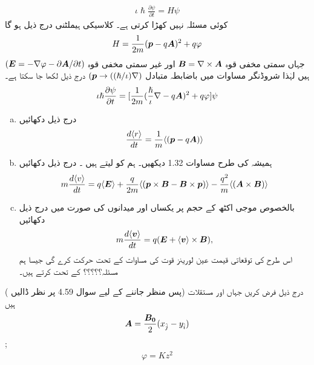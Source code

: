 \begin{align}
    \iota\hslash\frac{\partial\psi}{\partial t}=H\psi
\end{align}
کوئی مسئلہ نہیں کھڑا کرتی ہے۔ کلاسیکی ہیملٹنی درج ذیل ہو گا 
\begin{align}
    H=\frac{1}{2m}({{\boldsymbol{p}}}-q{{\boldsymbol{A}}})^2+q\varphi
\end{align}
 جہاں   سمتی مخفی قوہ \({{\boldsymbol{B}}}=\nabla \times {\ensuremath{{\boldsymbol{A}}}}\) اور  غیر سمتی مخفی قوہ \(({{\boldsymbol{E}}}= -\nabla\varphi-\partial{\ensuremath{{\boldsymbol{A}}}}/\partial t)\) ہیں لہٰذا شروڈنگر مساوات میں باضابطہ متبادل \(({{\boldsymbol{p}}}\rightarrow((\hslash/\iota)\nabla)\) درج ذیل لکھا جا سکتا ہے۔
\begin{align}
    \iota\hslash\frac{\partial\psi}{\partial t}=[\frac{1}{2m}(\frac{\hslash}{\iota}\nabla-q{{\boldsymbol{A}}})^2+q\varphi]\psi
\end{align}
\begin{enumerate}[a.]
\item درج ذیل دکھائیں 
  \begin{align}
    \frac{d\langle r \rangle }{dt}=\frac{1}{m}\langle({{\boldsymbol{p}}}-q{{\boldsymbol{A}}})\rangle
\end{align}
\item ہمیشہ کی طرح مساوات 1.32 دیکھیں۔ ہم   کو  لیتے ہیں ۔ درج ذیل دکھائیں 
\begin{align}
    m\frac{d\langle v \rangle}{dt}=q\langle{\ensuremath{{\boldsymbol{E}}}}\rangle+\frac{q}{2m}\langle({{\boldsymbol{p}}}\times{\ensuremath{{\boldsymbol{B}}}}-{{\boldsymbol{B}}}\times{\ensuremath{{\boldsymbol{p}}}})\rangle-\frac{q^2}{m} \langle ({{\boldsymbol{A}}}\times{\ensuremath{{\boldsymbol{B}}}})\rangle
\end{align}
\item    بالخصوص موجی اکٹھ کے حجم پر یکساں  اور  میدانوں کی صورت میں درج ذیل دکھائیں 
  \begin{align}
    m\frac{d\langle {\ensuremath{{\boldsymbol{v}}}}\rangle}{dt}=q({{\boldsymbol{E}}}+\langle{\ensuremath{{\boldsymbol{v}}}}\rangle\times{\ensuremath{{\boldsymbol{B}}}}),
\end{align}
  اس طرح  کی توقعاتی قیمت عین لورینز قوت کی مساوات کے تحت حرکت کرے گی جیسا ہم مسئلہ؟؟؟؟؟ کے تحت کرتے ہیں۔
\end{enumerate}
( پس منظر جاننے کے لیے سوال 4.59 پر نظر ڈالیں) درج ذیل فرض کریں جہاں  اور   مستقلات ہیں 
\begin{align*}
    {\ensuremath{{\boldsymbol{A}}}}=\frac{{{\boldsymbol{B_0}}}}{2}(x_{\hat{j}}-y_{\hat{i}})
\end{align*}
;
\begin{align*}
    \varphi=Kz^2
\end{align*} 
